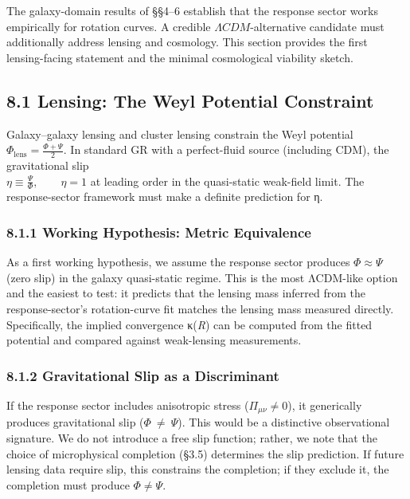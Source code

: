 The galaxy-domain results of §§4--6 establish that the response sector works empirically for rotation curves. A credible \(\Lambda CDM\)-alternative candidate must additionally address lensing and cosmology. This section provides the first lensing-facing statement and the minimal cosmological viability sketch.

\subsection{8.1 Lensing: The Weyl Potential Constraint}\label{lensing-the-weyl-potential-constraint}

Galaxy--galaxy lensing and cluster lensing constrain the Weyl potential \(\Phi_{\text{lens}} = \frac{\Phi + \Psi}{2}\). In standard GR with a perfect-fluid source (including CDM), the gravitational slip\\
\(\eta \equiv \frac{\Psi}{\Phi},\quad\quad\eta = 1\) at leading order in the quasi-static weak-field limit. The response-sector framework must make a definite prediction for η.

\subsubsection{8.1.1 Working Hypothesis: Metric Equivalence}\label{working-hypothesis-metric-equivalence}

As a first working hypothesis, we assume the response sector produces \(\Phi \approx \Psi\) (zero slip) in the galaxy quasi-static regime. This is the most ΛCDM-like option and the easiest to test: it predicts that the lensing mass inferred from the response-sector's rotation-curve fit matches the lensing mass measured directly. Specifically, the implied convergence κ(\emph{R}) can be computed from the fitted potential and compared against weak-lensing measurements.

\subsubsection{8.1.2 Gravitational Slip as a Discriminant}\label{gravitational-slip-as-a-discriminant}

If the response sector includes anisotropic stress (\(\Pi_{\mu\nu} \neq 0\)), it generically produces gravitational slip (\(\Phi\  \neq \ \Psi\)). This would be a distinctive observational signature. We do not introduce a free slip function; rather, we note that the choice of microphysical completion (§3.5) determines the slip prediction. If future lensing data require slip, this constrains the completion; if they exclude it, the completion must produce \(\Phi \neq \Psi\).


